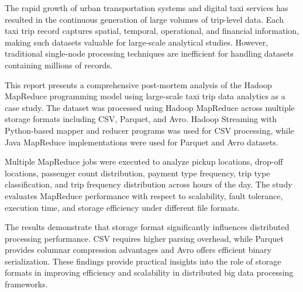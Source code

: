 \documentclass[12pt,a4paper]{report}
\begin{document}

\vspace{0.5cm}

The rapid growth of urban transportation systems and digital taxi services has resulted
in the continuous generation of large volumes of trip-level data. Each taxi trip record
captures spatial, temporal, operational, and financial information, making such datasets
valuable for large-scale analytical studies. However, traditional single-node processing
techniques are inefficient for handling datasets containing millions of records.

This report presents a comprehensive post-mortem analysis of the Hadoop MapReduce
programming model using large-scale taxi trip data analytics as a case study. The dataset
was processed using Hadoop MapReduce across multiple storage formats including CSV,
Parquet, and Avro. Hadoop Streaming with Python-based mapper and reducer programs
was used for CSV processing, while Java MapReduce implementations were used for
Parquet and Avro datasets.

Multiple MapReduce jobs were executed to analyze pickup locations, drop-off locations,
passenger count distribution, payment type frequency, trip type classification, and trip
frequency distribution across hours of the day. The study evaluates MapReduce
performance with respect to scalability, fault tolerance, execution time, and storage
efficiency under different file formats.

The results demonstrate that storage format significantly influences distributed processing
performance. CSV requires higher parsing overhead, while Parquet provides columnar
compression advantages and Avro offers efficient binary serialization. These findings
provide practical insights into the role of storage formats in improving efficiency and
scalability in distributed big data processing frameworks.

\clearpage



\newpage

\tableofcontents
\clearpage
\listoffigures
{}
\clearpage
\listoftables
{}
\clearpage

\setcounter{page}{1}
\setlength{\parindent}{20pt} %
\setlength{\parskip}{1.0em} %
\end{document}
